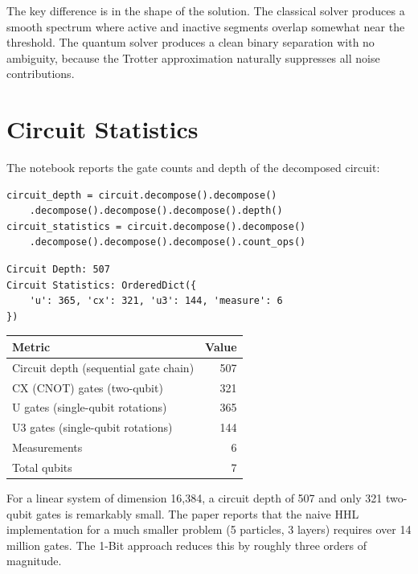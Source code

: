 \documentclass[11pt, a4paper]{article}
\begin{document}
The key difference is in the shape of the solution. The classical solver
produces a smooth spectrum where active and inactive segments overlap
somewhat near the threshold. The quantum solver produces a clean binary
separation with no ambiguity, because the Trotter approximation naturally
suppresses all noise contributions.

\section{Circuit Statistics}

The notebook reports the gate counts and depth of the decomposed circuit:

\begin{lstlisting}[caption={Circuit statistics}]
circuit_depth = circuit.decompose().decompose()
    .decompose().decompose().decompose().depth()
circuit_statistics = circuit.decompose().decompose()
    .decompose().decompose().decompose().count_ops()
\end{lstlisting}

\begin{verbatim}
Circuit Depth: 507
Circuit Statistics: OrderedDict({
    'u': 365, 'cx': 321, 'u3': 144, 'measure': 6
})
\end{verbatim}

\begin{center}
\begin{tabular}{lr}
\toprule
\textbf{Metric} & \textbf{Value} \\
\midrule
Circuit depth (sequential gate chain) & 507 \\
CX (CNOT) gates (two-qubit)           & 321 \\
U gates (single-qubit rotations)       & 365 \\
U3 gates (single-qubit rotations)      & 144 \\
Measurements                           & 6 \\
Total qubits                           & 7 \\
\bottomrule
\end{tabular}
\end{center}

For a linear system of dimension 16,384, a circuit depth of 507 and only
321 two-qubit gates is remarkably small. The paper reports that the naive
HHL implementation for a much smaller problem (5 particles, 3 layers)
requires over 14 million gates. The 1-Bit approach reduces this by roughly
three orders of magnitude.
\end{document}

